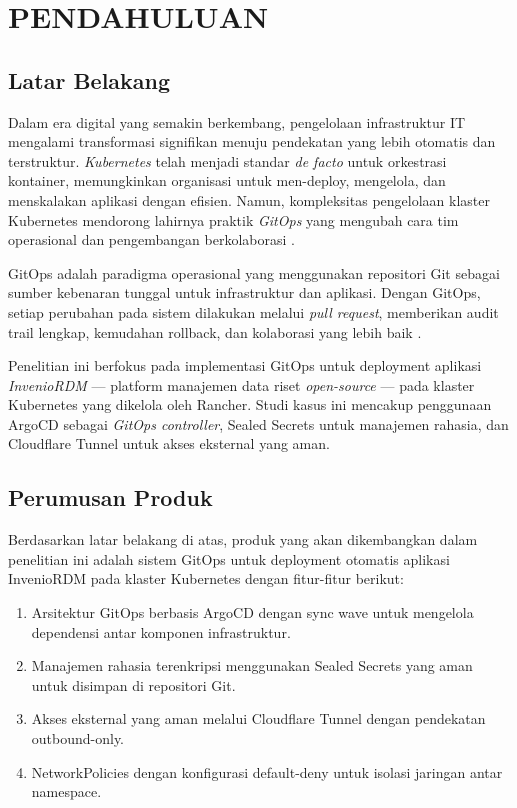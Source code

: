 \chapter{PENDAHULUAN}

\section{Latar Belakang}

Dalam era digital yang semakin berkembang, pengelolaan infrastruktur IT mengalami transformasi signifikan menuju pendekatan yang lebih otomatis dan terstruktur. \textit{Kubernetes} telah menjadi standar \textit{de facto} untuk orkestrasi kontainer, memungkinkan organisasi untuk men-deploy, mengelola, dan menskalakan aplikasi dengan efisien. Namun, kompleksitas pengelolaan klaster Kubernetes mendorong lahirnya praktik \textit{GitOps} yang mengubah cara tim operasional dan pengembangan berkolaborasi \citep{weaveworks-gitops}.

GitOps adalah paradigma operasional yang menggunakan repositori Git sebagai sumber kebenaran tunggal untuk infrastruktur dan aplikasi. Dengan GitOps, setiap perubahan pada sistem dilakukan melalui \textit{pull request}, memberikan audit trail lengkap, kemudahan rollback, dan kolaborasi yang lebih baik \citep{gitops-principles}.

Penelitian ini berfokus pada implementasi GitOps untuk deployment aplikasi \textit{InvenioRDM} --- platform manajemen data riset \textit{open-source} --- pada klaster Kubernetes yang dikelola oleh Rancher. Studi kasus ini mencakup penggunaan ArgoCD sebagai \textit{GitOps controller}, Sealed Secrets untuk manajemen rahasia, dan Cloudflare Tunnel untuk akses eksternal yang aman.

\section{Perumusan Produk}

Berdasarkan latar belakang di atas, produk yang akan dikembangkan dalam penelitian ini adalah sistem GitOps untuk deployment otomatis aplikasi InvenioRDM pada klaster Kubernetes dengan fitur-fitur berikut:

\begin{enumerate}
  \item Arsitektur GitOps berbasis ArgoCD dengan sync wave untuk mengelola dependensi antar komponen infrastruktur.
  \item Manajemen rahasia terenkripsi menggunakan Sealed Secrets yang aman untuk disimpan di repositori Git.
  \item Akses eksternal yang aman melalui Cloudflare Tunnel dengan pendekatan outbound-only.
  \item NetworkPolicies dengan konfigurasi default-deny untuk isolasi jaringan antar namespace.
\end{enumerate}

